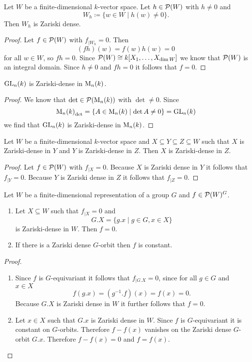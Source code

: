 \begin{lem}
 Let $W$ be a finite-dimensional $k$-vector space. Let $h \in \mathcal{P}(W)$ with $h \neq 0$ and
 \[
  W_h \coloneqq \{w \in W \mid h(w) \neq 0\}.
 \]
 Then $W_h$ is Zariski dense.
\end{lem}
\begin{proof}
 Let $f \in \mathcal{P}(W)$ with $f_{|W_h} = 0$. Then
 \[
  (fh)(w) = f(w)h(w) = 0
 \]
 for all $w \in W$, so $fh = 0$. Since $\mathcal{P}(W) \cong k[X_1, \dotsc, X_{\dim W}]$ we know that $\mathcal{P}(W)$ is an integral domain. Since $h \neq 0$ and $fh = 0$ it follows that $f = 0$.
\end{proof}


\begin{cor}
 $\operatorname{GL}_n(k)$ is Zariski-dense in $\operatorname{M}_n(k)$.
\end{cor}
\begin{proof}
 We know that $\det \in \mathcal{P}(\operatorname{M}_n(k))$ with $\det \neq 0$. Since
 \[
  {\operatorname{M}_n(k)}_{\det} = \{A \in \operatorname{M}_n(k) \mid \det A \neq 0\} = \operatorname{GL}_n(k)
 \]
 we find that $\operatorname{GL}_n(k)$ is Zariski-dense in $\operatorname{M}_n(k)$.
\end{proof}


\begin{prop}
 Let $W$ be a finite-dimensional $k$-vector space and $X \subseteq Y \subseteq Z \subseteq W$ such that $X$ is Zariski-dense in $Y$ and $Y$ is Zariski-dense in $Z$. Then $X$ is Zariski-dense in $Z$.
\end{prop}
\begin{proof}
 Let $f \in \mathcal{P}(W)$ with $f_{|X} = 0$. Because $X$ is Zariski dense in $Y$ it follows that $f_{|Y} = 0$. Because $Y$ is Zariski dense in $Z$ it follows that $f_{|Z} = 0$.
\end{proof}


\begin{lem}\label{lem: zariski density orbits}
 Let $W$ be a finite-dimensional representation of a group $G$ and $f \in \mathcal{P}(W)^G$.
 \begin{enumerate}[label=\emph{\alph*)},leftmargin=*]
  \item
   Let $X \subseteq W$ such that $f_{|X} = 0$ and
   \[
    G.X = \{g.x \mid g \in G, x \in X\}
   \]
   is Zariski-dense in $W$. Then $f = 0$.
  \item
   If there is a Zariski dense $G$-orbit then $f$ is constant.
 \end{enumerate}
\end{lem}
\begin{proof}
 \begin{enumerate}[label=\emph{\alph*)},leftmargin=*]
  \item
   Since $f$ is $G$-equivariant it follows that $f_{|G.X} = 0$, since for all $g \in G$ and $x \in X$
   \[
    f(g.x) = \left(g^{-1}.f\right)(x) = f(x) = 0.
   \]
   Because $G.X$ is Zariski dense in $W$ it further follows that $f = 0$.
  \item
   Let $x \in X$ such that $G.x$ is Zariski dense in $W$. Since $f$ is $G$-equivariant it is constant on $G$-orbits. Therefore $f-f(x)$ vanishes on the Zariski dense $G$-orbit $G.x$. Therefore $f-f(x) = 0$ and $f = f(x)$.
  \qedhere
 \end{enumerate}
\end{proof}


